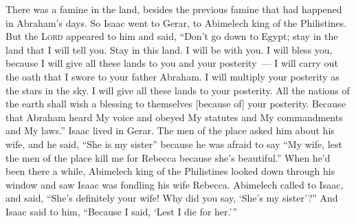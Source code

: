 
\begin{inparaenum}
     There was a famine in the land, besides the previous famine that had happened in Abraham's days. So Isaac went to Gerar, to Abimelech king of the Philistines.%
     But the \textsc{Lord} appeared to him and said, ``Don't go down to Egypt; stay in the land that I will tell you.%
     Stay in this land. I will be with you. I will bless you, because I will give all these lands to you and your posterity~--- I will carry out the oath that I swore to your father Abraham.%
     I will multiply your posterity as the stars in the sky. I will give all these lands to your posterity. All the nations of the earth shall wish a blessing to themselves [because of] your posterity.%
     Because that Abraham heard My voice and obeyed My statutes and My commandments and My laws.''%
     Isaac lived in Gerar.%
     The men of the place asked him about his wife, and he said, ``She is my sister'' because he was afraid to say ``My wife, lest the men of the place kill me for Rebecca because she's beautiful.''%
     When he'd been there a while, Abimelech king of the Philistines looked down through his window and saw Isaac was fondling his wife Rebecca.%
     Abimelech called to Isaac, and said, ``She's definitely your wife! Why did you say, `She's my sister'?'' And Isaac said to him, ``Because I said, `Lest I die for her.'\thinspace''%

\end{inparaenum}
